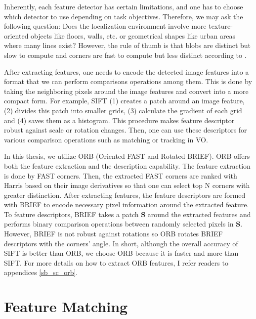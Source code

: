 \documentclass[a4paper]{report}
\numberwithin{figure}{section}
\begin{document}
Inherently, each feature detector has certain limitations, and one has to 
choose which detector to use depending on task objectives. Therefore, we may 
ask the following question: Does the localization environment involve more 
texture-oriented objects like floors, walls, etc. or geometrical shapes like 
urban areas where many lines exist?  However, the rule of thumb is that blobs 
are distinct but slow to compute and corners are fast to compute but less 
distinct according to \parencite{Fraundorfer2012}. 


After extracting features, one needs to encode the detected image features 
into a format that we can perform comparisons operations among them. 
This is done by taking the neighboring pixels around the image features and 
convert into a more compact form. For example, SIFT (1) creates a patch around 
an 
image feature, (2) divides this patch into 
smaller grids, (3) calculate the gradient of each grid and (4) saves them as a 
histogram.  This procedure makes feature descriptor robust against scale or 
rotation changes. Then, one can use these descriptors for various comparison 
operations such as matching or tracking in VO. 

In this thesis, we utilize ORB (Oriented FAST and Rotated BRIEF). ORB offers 
both the feature extraction and the description capability. The feature 
extraction is done by FAST corners. Then, the extracted FAST corners are 
ranked with Harris based on their image derivatives so that one can select 
top N corners with greater distinction. After extracting features, the 
feature descriptors are formed with BRIEF to encode necessary pixel 
information around the extracted feature. To feature descriptors, BRIEF takes 
a patch $\mathbf{S}$ around the extracted features and performs binary 
comparison operations between randomly selected pixels in $\mathbf{S}$. 
However, BRIEF is not robust against rotations so ORB rotates BRIEF 
descriptors with the corners' angle. In short, although the overall accuracy 
of SIFT is better than ORB, we choose ORB because it is faster and more than 
SIFT. For more details on how to extract ORB features, I refer readers to 
appendices \ref{sb_sc_orb}.


\section{Feature Matching} \label{sc_feature_matching}
\end{document}
